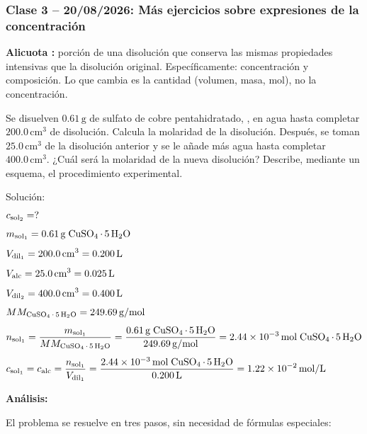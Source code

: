 {}
\subsubsection*{\textcolor{blueunam}{Clase 3 -- 20/08/2026: Más ejercicios sobre expresiones de la concentración}}

\textbf{Alicuota {\color{red}{(alc)}}:} porción de una disolución que conserva las mismas 
propiedades intensivas que la disolución original. Específicamente: concentración 
y composición. Lo que cambia es la cantidad (volumen, masa, mol), no la 
concentración.

\begin{exercise}{}{}
Se disuelven $0.61\,\mathrm{g}$ de sulfato de cobre pentahidratado, 
, en agua hasta completar $200.0\,\mathrm{cm^3}$ de disolución. 
Calcula la molaridad de la disolución. Después, se toman $25.0\,\mathrm{cm^3}$ 
de la disolución anterior y se le añade más agua hasta completar 
$400.0\,\mathrm{cm^3}$. ¿Cuál será la molaridad de la nueva disolución? 
Describe, mediante un esquema, el procedimiento experimental.

Solución:
\begin{align*}
    &c_{\mathrm{sol_2}} = ? \\[4pt]
    &m_{\mathrm{sol_1}} = 0.61\,\mathrm{g}\;\ce{CuSO4.5H2O} \\[4pt]
    &V_{\mathrm{dil_1}} = 200.0\,\mathrm{cm^3} = 0.200\,\mathrm{L} \\[4pt]
    &V_{\mathrm{alc}} = 25.0\,\mathrm{cm^3} = 0.025\,\mathrm{L} \\[4pt]
    &V_{\mathrm{dil_2}} = 400.0\,\mathrm{cm^3} = 0.400\,\mathrm{L} \\[4pt]
    &MM_{\mathrm{\ce{CuSO4.5H2O}}} = 249.69\,\mathrm{g/mol} \\[4pt]
    &n_{\mathrm{sol_1}} = \frac{m_{\mathrm{sol_1}}}{MM_{\mathrm{\ce{CuSO4.5H2O}}}}
    = \frac{0.61\,\mathrm{g}\;\ce{CuSO4.5H2O}}{249.69\,\mathrm{g/mol}}
    = \num{2.44e-3}\,\mathrm{mol}\;\ce{CuSO4.5H2O} \\[4pt]
    &c_{\mathrm{sol_1}} = c_{\mathrm{alc}} = \frac{n_{\mathrm{sol_1}}}{V_{\mathrm{dil_1}}}
    = \frac{\num{2.44e-3}\,\mathrm{mol}\;\ce{CuSO4.5H2O}}{0.200\,\mathrm{L}}
    = \num{1.22e-2}\,\mathrm{mol/L}
\end{align*}

\textbf{Análisis:}

El problema se resuelve en tres pasos, sin necesidad de fórmulas especiales:


\end{exercise}
